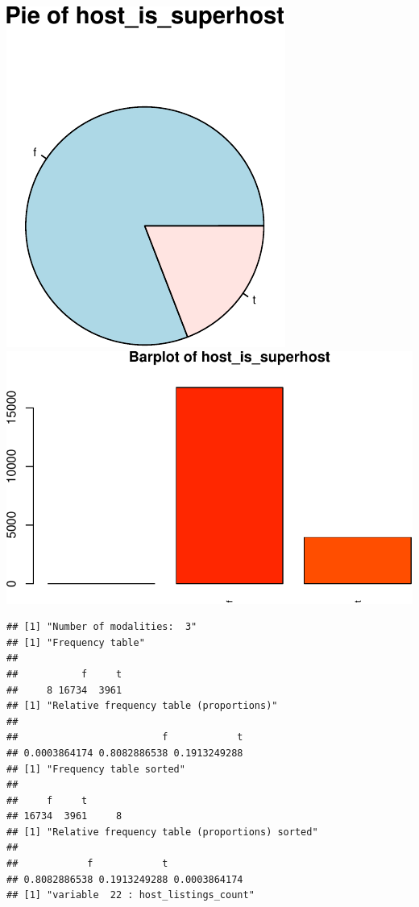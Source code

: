 \includegraphics{anal_files/figure-latex/unnamed-chunk-7-8.pdf}
\includegraphics{anal_files/figure-latex/unnamed-chunk-7-9.pdf}

\begin{verbatim}
## [1] "Number of modalities:  3"
## [1] "Frequency table"
## 
##           f     t 
##     8 16734  3961 
## [1] "Relative frequency table (proportions)"
## 
##                         f            t 
## 0.0003864174 0.8082886538 0.1913249288 
## [1] "Frequency table sorted"
## 
##     f     t       
## 16734  3961     8 
## [1] "Relative frequency table (proportions) sorted"
## 
##            f            t              
## 0.8082886538 0.1913249288 0.0003864174 
## [1] "variable  22 : host_listings_count"
\end{verbatim}

